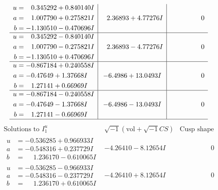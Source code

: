 \documentclass[1p]{elsarticle_modified}
\theoremstyle{definition}
\newcommand{\I}{\sqrt{-1}}
\begin{document}
$$\begin{array}{c|c|c}
\begin{aligned}
u &= \phantom{-}0.345292 + 0.840140 I \\
a &= \phantom{-}1.007790 + 0.275821 I \\
b &= -1.130510 - 0.470696 I\end{aligned}
 & \phantom{-}2.36893 + 4.77276 I & \phantom{-0.000000 } 0 \\ \hline\begin{aligned}
u &= \phantom{-}0.345292 - 0.840140 I \\
a &= \phantom{-}1.007790 - 0.275821 I \\
b &= -1.130510 + 0.470696 I\end{aligned}
 & \phantom{-}2.36893 - 4.77276 I & \phantom{-0.000000 } 0 \\ \hline\begin{aligned}
u &= -0.867184 + 0.240558 I \\
a &= -0.47649 + 1.37668 I \\
b &= \phantom{-}1.27141 + 0.66969 I\end{aligned}
 & -6.4986 + 13.0493 I & \phantom{-0.000000 } 0 \\ \hline\begin{aligned}
u &= -0.867184 - 0.240558 I \\
a &= -0.47649 - 1.37668 I \\
b &= \phantom{-}1.27141 - 0.66969 I\end{aligned}
 & -6.4986 - 13.0493 I & \phantom{-0.000000 } 0\\
 \hline 
 \end{array}$$\newpage$$\begin{array}{c|c|c}  
\text{Solutions to }I^u_{1}& \I (\text{vol} + \sqrt{-1}CS) & \text{Cusp shape}\\
 \hline 
\begin{aligned}
u &= -0.536285 + 0.966933 I \\
a &= -0.548316 + 0.237729 I \\
b &= \phantom{-}1.236170 - 0.610065 I\end{aligned}
 & -4.26410 - 8.12654 I & \phantom{-0.000000 } 0 \\ \hline\begin{aligned}
u &= -0.536285 - 0.966933 I \\
a &= -0.548316 - 0.237729 I \\
b &= \phantom{-}1.236170 + 0.610065 I\end{aligned}
 & -4.26410 + 8.12654 I & \phantom{-0.000000 } 0 \\ \hline\begin{aligned}

\end{aligned}
\end{array}$$
\end{document}
